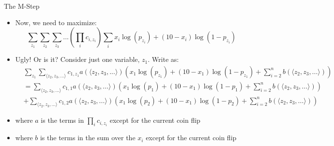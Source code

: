 \documentclass[aspectratio=169]{beamer}
\begin{document}
\begin{frame}{The M-Step}

	\begin{itemize}
	\item Now, we need to maximize:
		$$\sum_{z_1} \sum_{z_2 } \sum_{z_3}... \left( \prod_i c_{i, z_i} \right) \sum_i x_i \log (p_{z_i}) + (10 - x_i) \log (1 - p_{z_i})$$
	\item Ugly!  Or is it?  Consider just one variable, $z_1$.  Write as:
		\begin{align}
		&\sum_{z_1} \sum_{\langle z_2, z_3, ... \rangle} c_{1, z_1} a(\langle z_2, z_3, ... \rangle) 
	           \left(x_1 \log (p_{z_1}) + (10 - x_1) \log (1 - p_{z_1}) + \sum_{i = 2}^n b (\langle z_2, z_3, ... \rangle) \right) \nonumber \\
		&= \sum_{\langle z_2, z_3, ... \rangle} c_{1, 1} a(\langle z_2, z_3, ... \rangle) 
			\left(x_1 \log (p_1) + (10 - x_1) \log (1 - p_1) + \sum_{i = 2}^n b (\langle z_2, z_3, ... \rangle) \right) 
\nonumber \\ %
		&+ \sum_{\langle z_2, z_3, ... \rangle} c_{1, 2} a(\langle z_2, z_3, ... \rangle) 
			\left(x_1\log (p_2) + (10 - x_1) \log (1 - p_2) + \sum_{i = 2}^n b (\langle z_2, z_3, ... \rangle) \right)  %
\nonumber
		\end{align}
		\item where $a$ is the terms in $\prod_i c_{i, z_i}$ except for the current coin flip
		\item where $b$ is the terms in the sum over the $x_i$ except for the current coin flip
	\end{itemize}
\end{frame}
\end{document}
